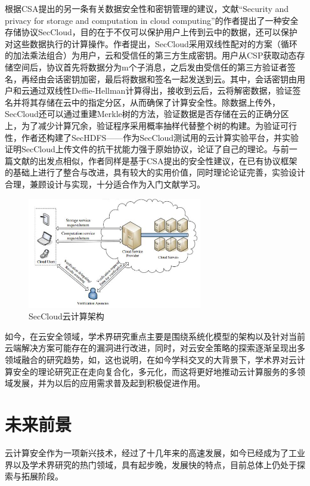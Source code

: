 \documentclass[a4paper, 12pt, conference]{ieeeconf}      %
\begin{document}
根据CSA提出的另一条有关数据安全性和密钥管理的建议，文献“Security and privacy for storage and computation in cloud computing”的作者提出了一种安全存储协议SecCloud，目的在于不仅可以保护用户上传到云中的数据，还可以保护对这些数据执行的计算操作。作者提出，SecCloud采用双线性配对的方案（循环的加法乘法组合）为用户，云和受信任的第三方生成密钥。用户从CSP获取动态存储空间后，协议首先将数据分为m个子消息，之后发由受信任的第三方验证者签名，再经由会话密钥加密，最后将数据和签名一起发送到云。其中，会话密钥由用户和云通过双线性Deffie-Hellman计算得出，接收到云后，云将解密数据，验证签名并将其存储在云中的指定分区，从而确保了计算安全性。除数据上传外，SecCloud还可以通过重建Merkle树的方法，验证数据是否存储在云的正确分区上，为了减少计算冗余，验证程序采用概率抽样代替整个树的构建\cite{wei2014security}。为验证可行性，作者还构建了SecHDFS——作为SecCloud测试用的云计算实验平台，并实验证明SecCloud上传文件的抗干扰能力强于原始协议，论证了自己的理论。与前一篇文献的出发点相似，作者同样是基于CSA提出的安全性建议，在已有协议框架的基础上进行了整合与改进，具有较大的实用价值，同时理论论证完善，实验设计合理，兼顾设计与实现，十分适合作为入门文献学习。


\begin{figure}[htbp]
	\centering
	\includegraphics[width=3in]{pic/图4}
	\caption{SecCloud云计算架构}
	\label{fig:4}
\end{figure}

如今，在云安全领域，学术界研究重点主要是围绕系统化模型的架构以及针对当前云端解决方案可能存在的漏洞进行改进，同时，对云安全策略的探索逐渐呈现出多领域融合的研究趋势，如\cite{bayuk2011cloud}，这也说明，在如今学科交叉的大背景下，学术界对云计算安全的理论研究正在走向复合化，多元化，而这将更好地推动云计算服务的多领域发展，并为以后的应用需求普及起到积极促进作用。

\section{未来前景}

云计算安全作为一项新兴技术，经过了十几年来的高速发展，如今已经成为了工业界以及学术界研究的热门领域，具有起步晚，发展快的特点，目前总体上仍处于探索与拓展阶段。
\end{document}
